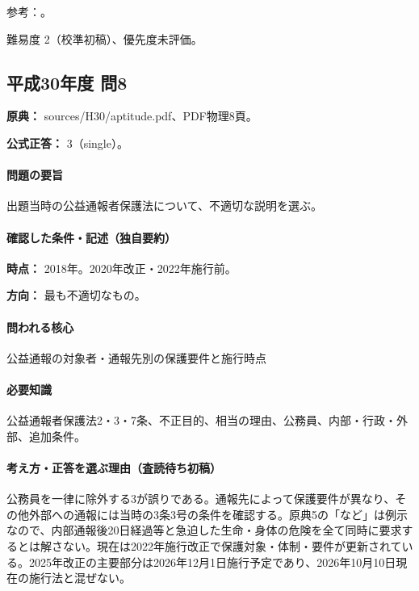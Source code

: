 \par 参考：\cite{caa_handbook_pre2022,caa_report_current,jp_constitution,jp_civil,jp_national_public}。

\par 難易度 2（校準初稿）、優先度未評価。

\subsection{平成30年度 問8}
\label{q:h30-reg-apt-08}

\noindent\textbf{原典：} sources/H30/aptitude.pdf、PDF物理8頁。

\textbf{公式正答：} 3（single）。

\paragraph{問題の要旨} 出題当時の公益通報者保護法について、不適切な説明を選ぶ。

\paragraph{確認した条件・記述（独自要約）}\mbox{}\par

\noindent\textbf{時点：} 2018年。2020年改正・2022年施行前。\par

\noindent\textbf{方向：} 最も不適切なもの。\par

\paragraph{問われる核心} 公益通報の対象者・通報先別の保護要件と施行時点

\paragraph{必要知識} 公益通報者保護法2・3・7条、不正目的、相当の理由、公務員、内部・行政・外部、追加条件。

\paragraph{考え方・正答を選ぶ理由（査読待ち初稿）} 公務員を一律に除外する3が誤りである。通報先によって保護要件が異なり、その他外部への通報には当時の3条3号の条件を確認する。原典5の「など」は例示なので、内部通報後20日経過等と急迫した生命・身体の危険を全て同時に要求するとは解さない。現在は2022年施行改正で保護対象・体制・要件が更新されている。2025年改正の主要部分は2026年12月1日施行予定であり、2026年10月10日現在の施行法と混ぜない。

